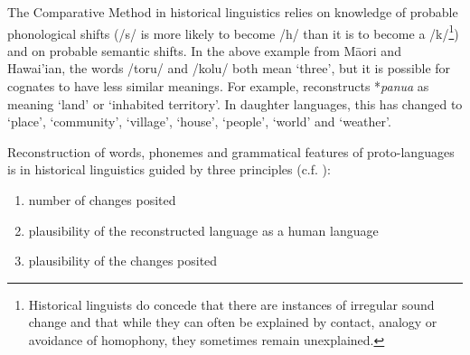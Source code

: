 \documentclass[draft,10pt]{article} %
\begin{document}
The Comparative Method in historical linguistics relies on knowledge of probable phonological shifts (/s/ is more likely to become /h/ than it is to become a /k/\footnote{Historical linguists do concede that there are instances of irregular sound change \citep{blust1996neogrammarian, campbell1996sound} and that while they can often be explained by contact, analogy or avoidance of homophony, they sometimes remain unexplained.}) and on probable semantic shifts. In the above example from M\={a}ori and Hawai'ian, the words /toru/ and /kolu/ both mean `three', but it is possible for cognates to have less similar meanings. For example, \citet{pawley2005meaning} reconstructs *\emph{panua} as meaning `land' or `inhabited territory'. In daughter languages, this has changed to `place', `community', `village', `house', `people', `world' and `weather'.








Reconstruction of words, phonemes and grammatical features of proto-languages is in historical linguistics guided by three principles (c.f. \citet[17-22]{clark1976aspects}):

\begin{enumerate}[label=(\roman*)]
\item number of changes posited
\item plausibility of the reconstructed language as a human language
\item plausibility of the changes posited
\end{enumerate}
\end{document}
